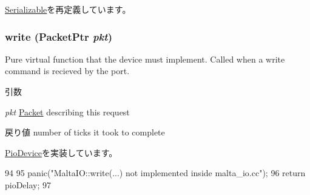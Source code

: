 \hyperlink{classSerializable_af100c4e9feabf3cd918619c88c718387}{Serializable}を再定義しています。\hypertarget{classMaltaIO_a4cefab464e72b5dd42c003a0a4341802}{
\subsubsection[{write}]{ write ({\bf PacketPtr} {\em pkt})}}
\label{classMaltaIO_a4cefab464e72b5dd42c003a0a4341802}
Pure virtual function that the device must implement. Called when a write command is recieved by the port. 
\begin{DoxyParams}{引数}
\item[{\em pkt}]\hyperlink{classPacket}{Packet} describing this request \end{DoxyParams}
\begin{DoxyReturn}{戻り値}
number of ticks it took to complete 
\end{DoxyReturn}


\hyperlink{classPioDevice_afe8371668d023bb2516b286e5e399b6f}{PioDevice}を実装しています。


\begin{DoxyCode}
94 {
95     panic("MaltaIO::write(...) not implemented inside malta_io.cc");
96     return pioDelay;
97 }
\end{DoxyCode}


